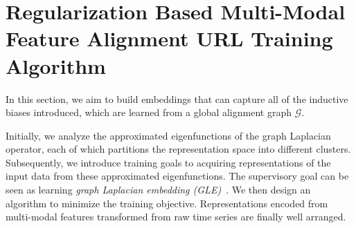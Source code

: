 \documentclass{article}
\begin{document}



\section{Regularization Based Multi-Modal Feature Alignment URL Training Algorithm}\label{sec:algo}

In this section, we aim to build embeddings that can capture all of the inductive biases introduced, which are learned from a global alignment graph $\mathcal{G}$. 

Initially, we analyze the approximated eigenfunctions of the graph Laplacian operator, each of which partitions the representation space into different clusters. Subsequently, we introduce training goals to acquiring representations of the input data from these approximated eigenfunctions. The supervisory goal can be seen as learning \textit{graph Laplacian embedding (GLE)}~\cite{trillos2021geometric}. We then design an algorithm to minimize the training objective. Representations encoded from multi-modal features transformed from raw time series are finally well arranged.
\end{document}
